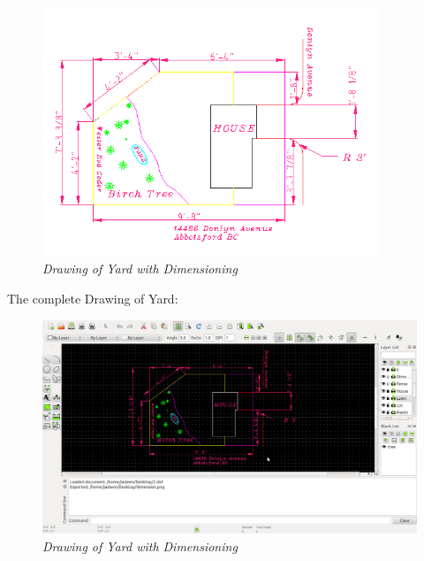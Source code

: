 \begin{enumerate}
{\begin{figure}[h!]
       \centering\includegraphics[width=380px]{./images-yard/dimension.png}
       \caption{\small \sl Drawing of Yard with Dimensioning}
       \end{figure}
\newpage
\large{The complete Drawing of Yard:}      
\begin{figure}[h!]
       \centering\includegraphics[width=450px]{./images-yard/complete.png}
       \caption{\small \sl Drawing of Yard with Dimensioning}
       \end{figure}}
\end{enumerate}
